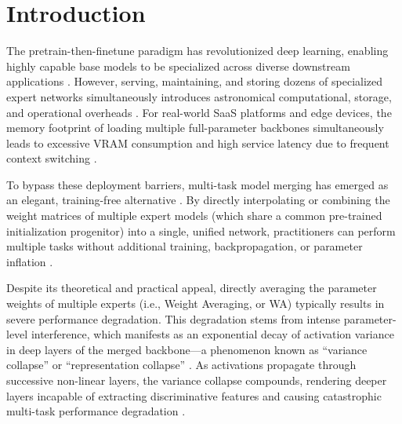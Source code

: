 \documentclass{article}
\theoremstyle{plain}
\theoremstyle{definition}
\theoremstyle{remark}
\begin{document}
\section{Introduction}
The pretrain-then-finetune paradigm has revolutionized deep learning, enabling highly capable base models to be specialized across diverse downstream applications \cite{He2016, Vaswani2017, Deng2009}. However, serving, maintaining, and storing dozens of specialized expert networks simultaneously introduces astronomical computational, storage, and operational overheads \cite{Caruana1997, Ruder2017, Collobert2008}. For real-world SaaS platforms and edge devices, the memory footprint of loading multiple full-parameter backbones simultaneously leads to excessive VRAM consumption and high service latency due to frequent context switching \cite{Liang2022}. 

To bypass these deployment barriers, multi-task model merging has emerged as an elegant, training-free alternative \cite{Wortsman2022, Tang2023, Xu2024}. By directly interpolating or combining the weight matrices of multiple expert models (which share a common pre-trained initialization progenitor) into a single, unified network, practitioners can perform multiple tasks without additional training, backpropagation, or parameter inflation \cite{Ilharco2023, Choshen2022, Jin2023}.

Despite its theoretical and practical appeal, directly averaging the parameter weights of multiple experts (i.e., Weight Averaging, or WA) typically results in severe performance degradation. This degradation stems from intense parameter-level interference, which manifests as an exponential decay of activation variance in deep layers of the merged backbone—a phenomenon known as ``variance collapse'' or ``representation collapse'' \cite{Jordan2023, wrsa2026}. As activations propagate through successive non-linear layers, the variance collapse compounds, rendering deeper layers incapable of extracting discriminative features and causing catastrophic multi-task performance degradation \cite{mspr2026}.
\end{document}
